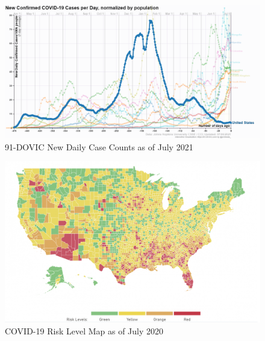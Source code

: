 \documentclass[print]{nuthesis}
\begin{document}
\begin{figure}[tbp]

{\centering \includegraphics[width=1\linewidth,]{images/91dovic-cases-july2021} 

}

\caption{91-DOVIC New Daily Case Counts as of July 2021}\label{fig:91divoc-cases-july2021}
\end{figure}

\begin{figure}[tbp]

{\centering \includegraphics[width=1\linewidth,]{images/covid19-summer2020-risk-map} 

}

\caption{COVID-19 Risk Level Map as of July 2020}\label{fig:covid19-summer2020-risk-map}
\end{figure}
\end{document}
